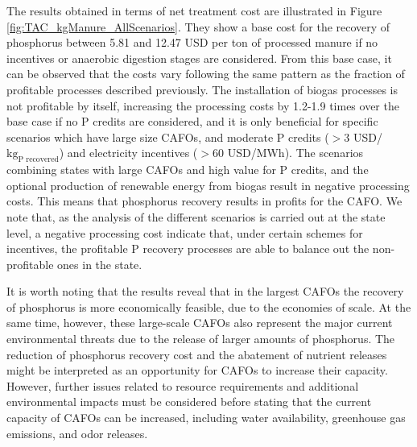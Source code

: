\begin{refsection}[referencesCh5]
%	

The results obtained in terms of net treatment cost are illustrated in Figure \ref{fig:TAC_kgManure_AllScenarios}. They  show a base cost for the recovery of phosphorus between 5.81 and 12.47 USD per ton of processed manure if no incentives or anaerobic digestion stages are considered. From this base case, it can be observed that the costs vary following the same pattern as the fraction of profitable processes described previously. The installation of biogas processes is not profitable by itself, increasing the processing costs by 1.2-1.9 times over the base case if no P credits are considered, and it is only beneficial for specific scenarios which have large size CAFOs, and moderate P credits ($>$3 USD/${\text{kg}_\text{P recovered}}$) and electricity incentives ($>$60 USD/MWh). The scenarios combining states with large CAFOs and high value for P credits, and the optional production of renewable energy from biogas result in negative processing costs. This means that phosphorus recovery results in profits for the CAFO. We note that, as the analysis of the different scenarios is carried out at the state level, a negative processing cost indicate that, under certain schemes for incentives, the profitable P recovery processes are able to balance out the non-profitable ones in the state.

It is worth noting that the results reveal that in the largest CAFOs the recovery of phosphorus is more economically feasible, due to the economies of scale. At the same time, however, these large-scale CAFOs also represent the major current environmental threats due to the release of larger amounts of phosphorus. The reduction of phosphorus recovery cost and the abatement of nutrient releases might be interpreted as an opportunity for CAFOs to increase their capacity. However, further issues related to resource requirements and additional environmental impacts must be considered before stating that the current capacity of CAFOs can be increased, including water availability, greenhouse gas emissions, and odor releases.


\end{refsection}
